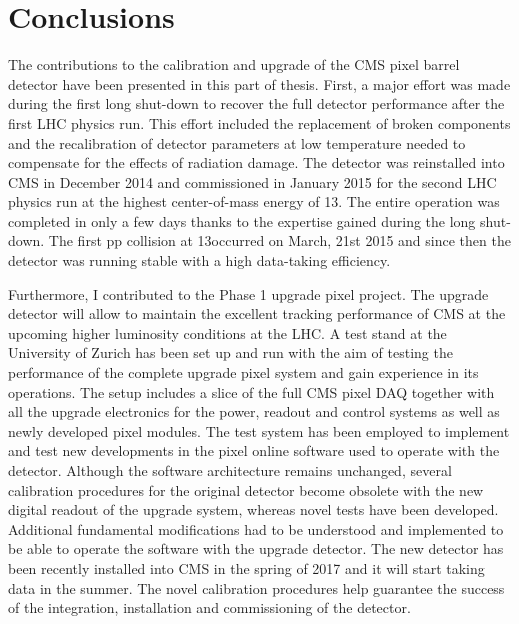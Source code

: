 \chapter{Conclusions}
\label{ch:summary2}

The contributions to the calibration and upgrade of the CMS pixel barrel detector have been presented in this part of thesis.
First, a major effort was made during the first long shut-down to recover the full detector performance after the first LHC physics run.
This effort included the replacement of broken components and the recalibration of detector parameters at low temperature needed to compensate for the effects of radiation damage.
The detector was reinstalled into CMS in December 2014 and commissioned in January 2015 for the second LHC physics run at the highest center-of-mass energy of 13\TeV.
The entire operation was completed in only a few days thanks to the expertise gained during the long shut-down.
The first pp collision at 13\TeV occurred on March, 21st 2015 and since then the detector
was running stable with a high data-taking efficiency.

Furthermore, I contributed to the Phase 1 upgrade pixel project.
The upgrade detector will allow to maintain the excellent tracking performance of CMS at the upcoming higher luminosity conditions at the LHC.
A test stand at the University of Zurich has been set up and run with the aim of testing the performance of the complete upgrade pixel system and gain experience in its operations.
The setup includes a slice of the full CMS pixel DAQ together with all the upgrade electronics for the power, readout and control systems as well as newly developed pixel modules.
The test system has been employed to implement and test new developments in the pixel online software used to operate with the detector.
Although the software architecture remains unchanged, several calibration procedures for the original detector become obsolete with the new digital readout of the upgrade system,
whereas novel tests have been developed. 
Additional fundamental modifications had to be understood and implemented to be able to operate the software with the upgrade detector.
The new detector has been recently installed into CMS in the spring of 2017 and it will start taking data in the summer.
The novel calibration procedures help guarantee the success of the integration, installation and commissioning of the detector.